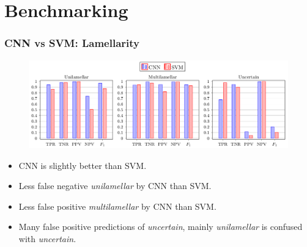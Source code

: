\documentclass{beamer}
\begin{document}
%
%

\section{Benchmarking}

\begin{frame}
\frametitle{CNN vs SVM: Lamellarity}

\begin{figure}
\centering
\includegraphics[width=\linewidth,height=0.8\textheight,keepaspectratio]{cnn_vs_svm_lamellarity.png} 
\end{figure}

\begin{itemize}
\item CNN is slightly better than SVM.
\item Less false negative \textit{unilamellar} by CNN than SVM.
\item Less false positive \textit{multilamellar} by CNN than SVM.
\item Many false positive predictions of \textit{uncertain}, mainly \textit{unilamellar} is confused with \textit{uncertain}.
\end{itemize}

\end{frame}
\end{document}
